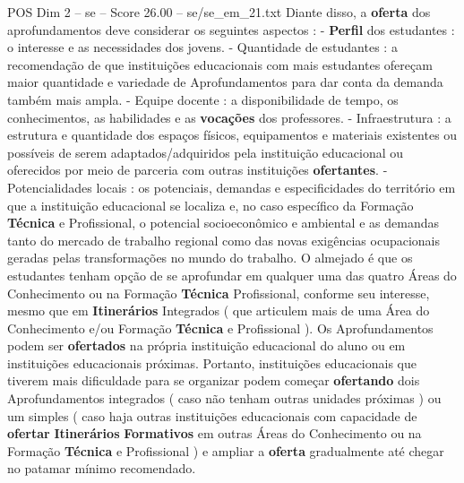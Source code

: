 \begin{textsample}{POS Dim 2 – se – Score 26.00 – se/se\_em\_21.txt}
Diante disso, a \textbf{oferta} dos aprofundamentos deve considerar os seguintes aspectos : - \textbf{Perfil} dos estudantes : o interesse e as necessidades dos jovens. - Quantidade de estudantes : a recomendação de que instituições educacionais com mais estudantes ofereçam maior quantidade e variedade de Aprofundamentos para dar conta da demanda também mais ampla. - Equipe docente : a disponibilidade de tempo, os conhecimentos, as habilidades e as \textbf{vocações} dos professores. - Infraestrutura : a estrutura e quantidade dos espaços físicos, equipamentos e materiais existentes ou possíveis de serem adaptados/adquiridos pela instituição educacional ou oferecidos por meio de parceria com outras instituições \textbf{ofertantes}. - Potencialidades locais : os potenciais, demandas e especificidades do território em que a instituição educacional se localiza e, no caso específico da Formação \textbf{Técnica} e Profissional, o potencial socioeconômico e ambiental e as demandas tanto do mercado de trabalho regional como das novas exigências ocupacionais geradas pelas transformações no mundo do trabalho.
O almejado é que os estudantes tenham opção de se aprofundar em qualquer uma das quatro Áreas do Conhecimento ou na Formação \textbf{Técnica} Profissional, conforme seu interesse, mesmo que em \textbf{Itinerários} Integrados ( que articulem mais de uma Área do Conhecimento e/ou Formação \textbf{Técnica} e Profissional ).
Os Aprofundamentos podem ser \textbf{ofertados} na própria instituição educacional do aluno ou em instituições educacionais próximas.
Portanto, instituições educacionais que tiverem mais dificuldade para se organizar podem começar \textbf{ofertando} dois Aprofundamentos integrados ( caso não tenham outras unidades próximas ) ou um simples ( caso haja outras instituições educacionais com capacidade de \textbf{ofertar} \textbf{Itinerários} \textbf{Formativos} em outras Áreas do Conhecimento ou na Formação \textbf{Técnica} e Profissional ) e ampliar a \textbf{oferta} gradualmente até chegar no patamar mínimo recomendado.

\end{textsample}
